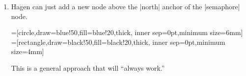 \begin{enumerate}
\item Hagen can just add a new node above the |north| anchor of the
  |semaphore| node.
{
=[circle,draw=blue!50,fill=blue!20,thick,
                   inner sep=0pt,minimum size=6mm]
=[rectangle,draw=black!50,fill=black!20,thick,
                        inner sep=0pt,minimum size=4mm]
\begin{codeexample}[]
\end{codeexample}
}
This is a general approach that will ``always work.''


\end{enumerate}
